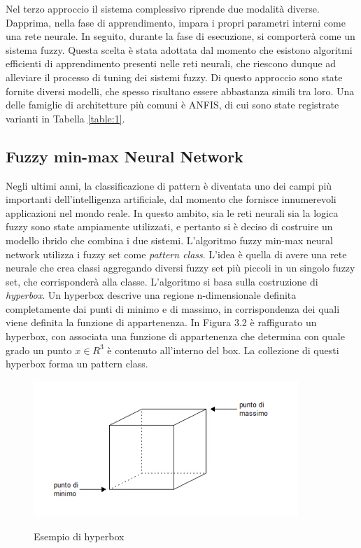 \documentclass[11pt,  oneside, openany]{book}
\begin{document}
Nel terzo approccio il sistema complessivo riprende due modalità diverse. Dapprima, nella fase di apprendimento, impara i propri parametri interni come una rete neurale. In seguito, durante la fase di esecuzione, si comporterà come un sistema fuzzy. Questa scelta è stata adottata dal momento che esistono algoritmi efficienti di apprendimento presenti nelle reti neurali, che riescono dunque ad alleviare il processo di tuning dei sistemi fuzzy. Di questo approccio sono state fornite diversi modelli, che spesso risultano essere abbastanza simili tra loro. Una delle famiglie di architetture più comuni è ANFIS, di cui sono state registrate varianti in Tabella \ref{table:1}.

\subsection{Fuzzy min-max Neural Network}

Negli ultimi anni, la classificazione di pattern è diventata uno dei campi più importanti dell'intelligenza artificiale, dal momento che fornisce innumerevoli applicazioni nel mondo reale. In questo ambito, sia le reti neurali sia la logica fuzzy sono state ampiamente utilizzati, e pertanto si è deciso di costruire un modello ibrido che combina i due sistemi. 
L'algoritmo fuzzy min-max neural network utilizza i fuzzy set come \textit{pattern class}. L'idea è quella di avere una rete neurale che crea classi aggregando diversi fuzzy set più piccoli in un singolo fuzzy set, che corrisponderà alla classe. L'algoritmo si basa sulla costruzione di \textit{hyperbox}. Un hyperbox descrive una regione n-dimensionale definita completamente dai punti di minimo e di massimo, in corrispondenza dei quali viene definita la funzione di appartenenza. In Figura 3.2 è raffigurato un hyperbox, con associata una funzione di appartenenza che determina con quale grado un punto $x\in R^3$ è contenuto all'interno del box. La collezione di questi hyperbox forma un pattern class. 

\begin{figure}[h!]
\begin{center}
  \includegraphics[width=10cm]{Immagini/hyperbox.png}\\
  \caption{Esempio di hyperbox}
\end{center}
\end{figure}
\end{document}

